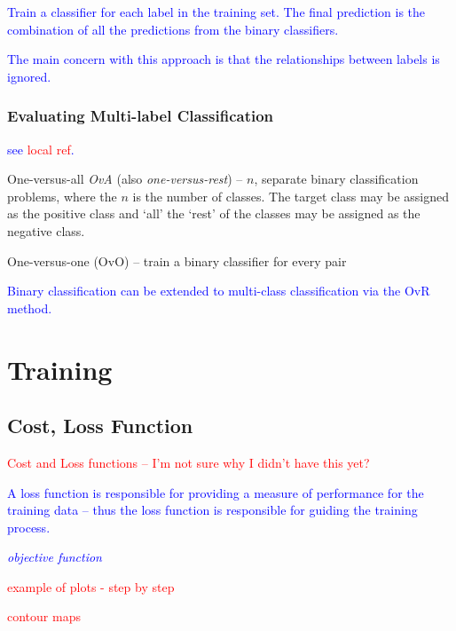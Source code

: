 \textcolor{blue}{Train a classifier for each label in the training set. The final prediction is the combination of all the predictions from the binary classifiers.}

\textcolor{blue}{The main concern with this approach is that the relationships between labels is ignored.}

\subsubsection{Evaluating Multi-label Classification}

\textcolor{blue}{see \textcolor{red}{local ref}.}

One-versus-all \emph{OvA} (also \emph{one-versus-rest}) -- $n$, separate binary classification problems, where the $n$ is the number of classes. The target class may be assigned as the positive class and `all' the `rest' of the classes may be assigned as the negative class.

One-versus-one (OvO) -- train a binary classifier for every pair


\textcolor{blue}{Binary classification can be extended to multi-class classification via the OvR method.}


\section{Training}

\subsection{Cost, Loss Function}

\textcolor{red}{Cost and Loss functions -- I'm not sure why I didn't have this yet?}

\textcolor{blue}{A loss function is responsible for providing a measure of performance for the training data -- thus the loss function is responsible for guiding the training process.}

\textcolor{blue}{\textit{objective function}}

\textcolor{red}{example of plots - step by step}

\textcolor{red}{contour maps}


